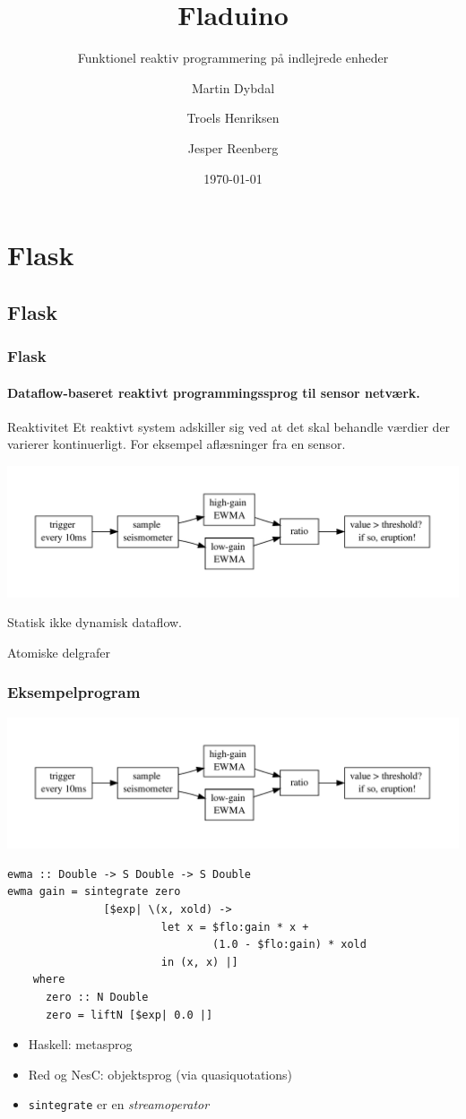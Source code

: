 \documentclass{beamer}
\title{Fladuino}
\subtitle{Funktionel reaktiv programmering på indlejrede enheder}
\author{Martin Dybdal \and Troels Henriksen \and Jesper Reenberg}
\institute{\textrm{Datalogisk Institut, Københavns Universitet}}
\date{\today}
\begin{document}
\frame{\titlepage}


\section{Flask}
\subsection{Flask}
\begin{frame}[t]
  \frametitle{Flask} 
  \framesubtitle{Dataflow-baseret reaktivt programmingssprog
    til sensor netværk.}

  \begin{block}{Reaktivitet}
    Et reaktivt system adskiller sig ved at det skal behandle værdier
    der varierer kontinuerligt. For eksempel aflæsninger fra en
    sensor.
  \end{block}

  \pause
  \includegraphics[width=\textwidth]{flask-ewma}

  \pause
  Statisk ikke dynamisk dataflow.

  Atomiske delgrafer
 
\end{frame}

\begin{frame}[t, fragile]
  \frametitle{Eksempelprogram} 

  \includegraphics[width=\textwidth]{flask-ewma}
  \pause
\tiny

\begin{verbatim}
ewma :: Double -> S Double -> S Double
ewma gain = sintegrate zero
               [$exp| \(x, xold) ->
                        let x = $flo:gain * x +
                                (1.0 - $flo:gain) * xold
                        in (x, x) |]
    where
      zero :: N Double
      zero = liftN [$exp| 0.0 |]
\end{verbatim}

\pause
\normalsize
\begin{itemize}
\item 
  Haskell: metasprog
\item 
  Red og NesC: objektsprog (via quasiquotations)
\item 
  \verb|sintegrate| er en \textit{streamoperator}
\end{itemize}

\end{frame}
\end{document}
